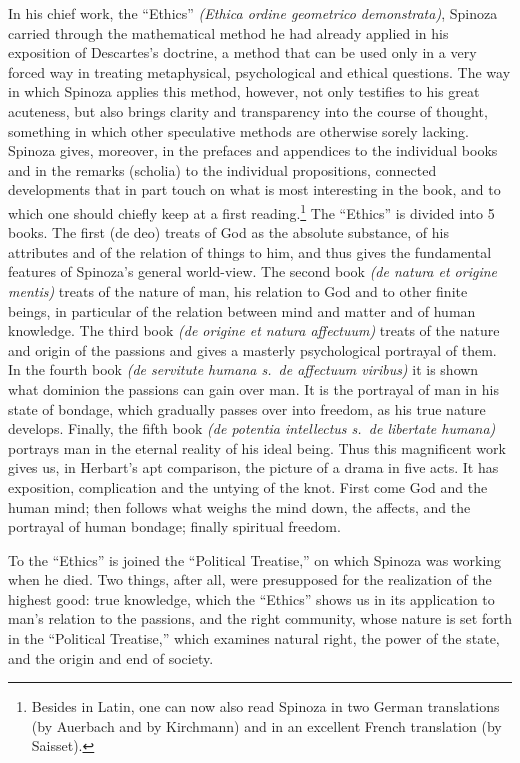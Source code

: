 \documentclass[12pt]{book}
\newcommand{\opage}[1]{\marginnote{\footnotesize\textit{[#1]}}}
\begin{document}
In his chief work, the ``Ethics'' \textit{(Ethica ordine geometrico demonstrata)},
Spinoza carried through the mathematical method he had already applied in his
exposition \opage{39}of Descartes's doctrine, a method that can be used only in a very
forced way in treating metaphysical, psychological and ethical questions. The way in
which Spinoza applies this method, however, not only testifies to his great acuteness,
but also brings clarity and transparency into the course of thought, something in
which other speculative methods are otherwise sorely lacking. Spinoza gives,
moreover, in the prefaces and appendices to the individual books and in the remarks
(scholia) to the individual propositions, connected developments that in part touch
on what is most interesting in the book, and to which one should chiefly keep at a
first reading.\footnote{Besides in Latin, one can now also read Spinoza in two German
translations (by Auerbach and by Kirchmann) and in an excellent French translation (by
Saisset).} The ``Ethics'' is divided into 5 books. The first (de deo) treats of God as
the absolute substance, of his attributes and of the relation of things to him, and
thus gives the fundamental features of Spinoza's general world-view. The second book
\textit{(de natura et origine mentis)} treats of the nature of man, his relation to
God and to other finite beings, in particular of the relation between mind and matter
and of human knowledge. The third book \textit{(de origine et natura affectuum)}
treats of the nature and origin of the passions and gives a masterly psychological
portrayal of them. In the fourth book \textit{(de servitute humana s.\ de affectuum
viribus)} it is shown what dominion the passions can gain over man. It is the
portrayal of man in his state of bondage, which gradually passes over into freedom,
\opage{40}as his true nature develops. Finally, the fifth book \textit{(de potentia
intellectus s.\ de libertate humana)} portrays man in the eternal reality of his ideal
being. Thus this magnificent work gives us, in Herbart's apt comparison, the picture of
a drama in five acts. It has exposition, complication and the untying of the knot.
First come God and the human mind; then follows what weighs the mind down, the
affects, and the portrayal of human bondage; finally spiritual freedom.

To the ``Ethics'' is joined the ``Political Treatise,'' on which Spinoza was working
when he died. Two things, after all, were presupposed for the realization of the
highest good: true knowledge, which the ``Ethics'' shows us in its application to
man's relation to the passions, and the right community, whose nature is set forth in
the ``Political Treatise,'' which examines natural right, the power of the state, and
the origin and end of society.
\end{document}
